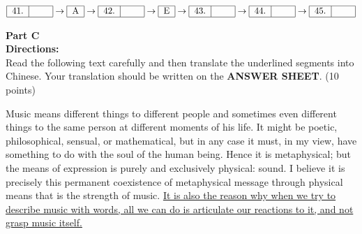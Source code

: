 \[ 
\begin{tabular}{|c|c|}
	\hline
	41. &  \hspace{1.5em} \\
	\hline
\end{tabular}
\rightarrow
\begin{tabular}{|c|}
	\hline
	A \\
	\hline
\end{tabular}
\rightarrow
\begin{tabular}{|c|c|}
	\hline
	42. &  \hspace{1.5em} \\
	\hline
\end{tabular}
\rightarrow
\begin{tabular}{|c|}
	\hline
	E \\
	\hline
\end{tabular}
\rightarrow
\begin{tabular}{|c|c|}
	\hline
	43. &  \hspace{1.5em} \\
	\hline
\end{tabular}
\rightarrow
\begin{tabular}{|c|c|}
	\hline
	44. &  \hspace{1.5em} \\
	\hline
\end{tabular}
\rightarrow
\begin{tabular}{|c|c|}
	\hline
	45. &  \hspace{1.5em} \\
	\hline
\end{tabular}
\]


\phantom{ \linefill \linefill \linefill \linefill \linefill}



\newpage

\noindent
\textbf{Part C}\\
\textbf{Directions:}\\
Read the following text carefully and then translate the
	underlined segments into Chinese. Your translation should be written on
	the \textbf{ANSWER SHEET}. (10 points)


\TiGanSpace


Music means different things to different people and sometimes even
different things to the same person at different moments of his life. It
might be poetic, philosophical, sensual, or mathematical, but in any
case it must, in my view, have something to do with the soul of the
human being. Hence it is metaphysical; but the means of expression is
purely and exclusively physical: sound. I believe it is precisely this
permanent coexistence of metaphysical message through physical means
that is the strength of music. \transnum \uline{It is also the reason why
	when we try to describe music with words, all we can do is articulate
	our reactions to it, and not grasp music itself.}

